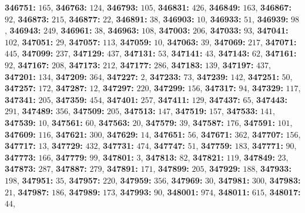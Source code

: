 \textsf{\bfseries 346751:} $165$, \textsf{\bfseries 346763:} $124$, \textsf{\bfseries 346793:} $105$, \textsf{\bfseries 346831:} $426$, \textsf{\bfseries 346849:} $163$, \textsf{\bfseries 346867:} $92$, \textsf{\bfseries 346873:} $215$, \textsf{\bfseries 346877:} $22$, \textsf{\bfseries 346891:} $38$, \textsf{\bfseries 346903:} $10$, \textsf{\bfseries 346933:} $51$, \textsf{\bfseries 346939:} $98$, \textsf{\bfseries 346943:} $249$, \textsf{\bfseries 346961:} $38$, \textsf{\bfseries 346963:} $108$, \textsf{\bfseries 347003:} $206$, \textsf{\bfseries 347033:} $93$, \textsf{\bfseries 347041:} $102$, \textsf{\bfseries 347051:} $29$, \textsf{\bfseries 347057:} $113$, \textsf{\bfseries 347059:} $10$, \textsf{\bfseries 347063:} $39$, \textsf{\bfseries 347069:} $217$, \textsf{\bfseries 347071:} $445$, \textsf{\bfseries 347099:} $237$, \textsf{\bfseries 347129:} $437$, \textsf{\bfseries 347131:} $53$, \textsf{\bfseries 347141:} $43$, \textsf{\bfseries 347143:} $62$, \textsf{\bfseries 347161:} $92$, \textsf{\bfseries 347167:} $208$, \textsf{\bfseries 347173:} $212$, \textsf{\bfseries 347177:} $286$, \textsf{\bfseries 347183:} $139$, \textsf{\bfseries 347197:} $437$, \textsf{\bfseries 347201:} $134$, \textsf{\bfseries 347209:} $364$, \textsf{\bfseries 347227:} $2$, \textsf{\bfseries 347233:} $73$, \textsf{\bfseries 347239:} $142$, \textsf{\bfseries 347251:} $50$, \textsf{\bfseries 347257:} $172$, \textsf{\bfseries 347287:} $12$, \textsf{\bfseries 347297:} $220$, \textsf{\bfseries 347299:} $156$, \textsf{\bfseries 347317:} $94$, \textsf{\bfseries 347329:} $117$, \textsf{\bfseries 347341:} $205$, \textsf{\bfseries 347359:} $454$, \textsf{\bfseries 347401:} $257$, \textsf{\bfseries 347411:} $129$, \textsf{\bfseries 347437:} $65$, \textsf{\bfseries 347443:} $291$, \textsf{\bfseries 347489:} $356$, \textsf{\bfseries 347509:} $205$, \textsf{\bfseries 347513:} $147$, \textsf{\bfseries 347519:} $157$, \textsf{\bfseries 347533:} $141$, \textsf{\bfseries 347539:} $10$, \textsf{\bfseries 347561:} $60$, \textsf{\bfseries 347563:} $20$, \textsf{\bfseries 347579:} $39$, \textsf{\bfseries 347587:} $176$, \textsf{\bfseries 347591:} $101$, \textsf{\bfseries 347609:} $116$, \textsf{\bfseries 347621:} $300$, \textsf{\bfseries 347629:} $14$, \textsf{\bfseries 347651:} $56$, \textsf{\bfseries 347671:} $362$, \textsf{\bfseries 347707:} $156$, \textsf{\bfseries 347717:} $13$, \textsf{\bfseries 347729:} $432$, \textsf{\bfseries 347731:} $474$, \textsf{\bfseries 347747:} $51$, \textsf{\bfseries 347759:} $183$, \textsf{\bfseries 347771:} $90$, \textsf{\bfseries 347773:} $166$, \textsf{\bfseries 347779:} $99$, \textsf{\bfseries 347801:} $3$, \textsf{\bfseries 347813:} $82$, \textsf{\bfseries 347821:} $119$, \textsf{\bfseries 347849:} $23$, \textsf{\bfseries 347873:} $287$, \textsf{\bfseries 347887:} $279$, \textsf{\bfseries 347891:} $171$, \textsf{\bfseries 347899:} $205$, \textsf{\bfseries 347929:} $188$, \textsf{\bfseries 347933:} $198$, \textsf{\bfseries 347951:} $35$, \textsf{\bfseries 347957:} $220$, \textsf{\bfseries 347959:} $356$, \textsf{\bfseries 347969:} $30$, \textsf{\bfseries 347981:} $300$, \textsf{\bfseries 347983:} $21$, \textsf{\bfseries 347987:} $186$, \textsf{\bfseries 347989:} $173$, \textsf{\bfseries 347993:} $90$, \textsf{\bfseries 348001:} $974$, \textsf{\bfseries 348011:} $615$, \textsf{\bfseries 348017:} $44$, 

